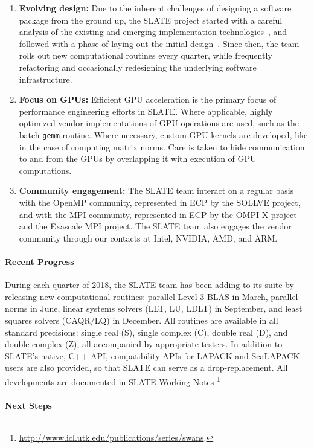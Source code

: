\begin{enumerate}
\item
\textbf{Evolving design:}
Due to the inherent challenges of designing a software package
from the ground up, the SLATE project started
with a careful analysis of the existing and emerging
implementation technologies~\cite{abdelfattah2017roadmap},
and followed with a phase
of laying out the initial design~\cite{kurzak2017designing}.
Since then, the team rolls out new computational routines every quarter,
while frequently refactoring and occasionally redesigning the underlying
software infrastructure.
\item
\textbf{Focus on GPUs:}
Efficient GPU acceleration is the primary focus of performance
engineering efforts in SLATE.
Where applicable, highly optimized vendor implementations of GPU operations
are used, such as the batch {\tt gemm} routine.
Where necessary, custom GPU kernels are developed, like in the case of computing
matrix norms.
Care is taken to hide communication to and from the GPUs by overlapping it with
execution of GPU computations.
\item
\textbf{Community engagement:}
The SLATE team interact on a regular basis with the OpenMP community,
represented in ECP by the SOLLVE project, and with the MPI community,
represented in ECP by the OMPI-X project and the Exascale MPI project.
The SLATE team also engages the vendor community through our contacts
at Intel, NVIDIA, AMD, and ARM.
\end{enumerate}

\paragraph{Recent Progress}

During each quarter of 2018, the SLATE team has been adding to its suite
by releasing new computational routines:
parallel Level 3 BLAS in March,
parallel norms in June,
linear systems solvers (LLT, LU, LDLT) in September,
and least squares solvers (CAQR/LQ) in December.
All routines are available in all standard precisions:
single real (S), single complex (C), double real (D), and double complex (Z),
all accompanied by appropriate testers.
In addition to SLATE's native, C++ API, compatibility APIs for LAPACK
and ScaLAPACK users are also provided, so that SLATE can serve
as a drop-replacement.
All developments are documented in SLATE Working Notes
\footnote{\url{http://www.icl.utk.edu/publications/series/swans}.}

\paragraph{Next Steps}

